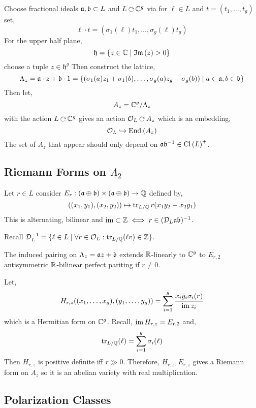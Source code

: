 \documentclass[12pt]{article}
\begin{document}
\renewcommand{\b}{\mathfrak{b}}
\newcommand{\h}{\mathfrak{h}}

Choose fractional ideals $\a, \b \sub L$ and $L \acts \CC^g$ via for $\ell \in L$ and $t = (t_1, \dots, t_g)$ set,
\[ \ell \cdot t = (\sigma_1(\ell) t_1, \dots, \sigma_g(\ell) t_g) \]
For the upper half plane,
\[ \h = \{ z \in \CC \mid \imag{z} > 0 \} \]
choose a tuple $z \in \h^g$ Then construct the lattice,
\[ \Lambda_z = \a \cdot z + \b \cdot 1 = \{ (\sigma_1
(a) z_1 + \sigma_1(b), \dots, \sigma_g(a) z_g + \sigma_g(b)) \mid a \in \a, b \in \b \} \]
Then let,
\[ A_z = \mathbb{C}^g / \Lambda_z \]
with the action $L \acts \CC^g$ gives an action $\cO_L \acts A_z$ which is an embedding,
\[ \mathcal{O}_L \hookrightarrow \mathrm{End}_{} \left( A_z \right) \]
The set of $A_z$ that appear should only depend on $\a \b^{-1} \in \Cl{L}^+$. 

\subsection{Riemann Forms on $\Lambda_2$}

\begin{defn}
Let $r \in L$ consider $E_r : (\a \oplus \b) \times (\a \oplus \b) \to \Q$ defined by,
\[ ((x_1, y_1), (x_2, y_2)) \mapsto \operatorname{\mathrm{tr}}_{L/\mathbb{Q}} r(x_1 y_2 - x_2 y_1) \]
This is alternating, bilinear and $\im \subset \Z \iff r \in (\D_L \a \b)^{-1}$.
\end{defn}

\begin{rmk}
Recall $\mathcal{D}_L^{-1} = \{ \ell \in L \mid \forall r \in \mathcal{O}_L : \operatorname{\mathrm{tr}}_{L/\mathbb{Q}}(\ell v) \in \mathbb{Z} \}$.
\end{rmk}

\begin{rmk}
The induced pairing on $\Lambda_z = \a z + \b$ extends $\mathbb{R}$-linearly to $\mathbb{C}^g$ to $E_{r,2}$ antisymmetric $\mathbb{R}$-bilinear perfect pariting if $r \neq 0$.
\end{rmk}

\begin{defn}
Let,
\[ H_{r,z}((x_1, \dots, x_g), (y_1, \dots, y_g)) = \sum_{i = 1}^g \frac{x_i \bar{y}_i \sigma_i(r)}{\operatorname{\mathrm{im}}{z_i}} \]
which is a Hermitian form on $\mathbb{C}^g$. Recall, $\operatorname{\mathrm{im}}{H_{r,z}} = E_{r,2}$ and,
\[ \operatorname{\mathrm{tr}}_{L/\mathbb{Q}}(\ell) = \sum_{i = 1}^g \sigma_i(\ell) \]
Then $H_{r,z}$ is positive definite iff $r \gg 0$. Therefore, $H_{r, z}, E_{r,z}$ gives a Riemann form on $A_z$ so it is an abelian variety with real multiplication. 
\end{defn}

\subsection{Polarization Classes}
\end{document}
